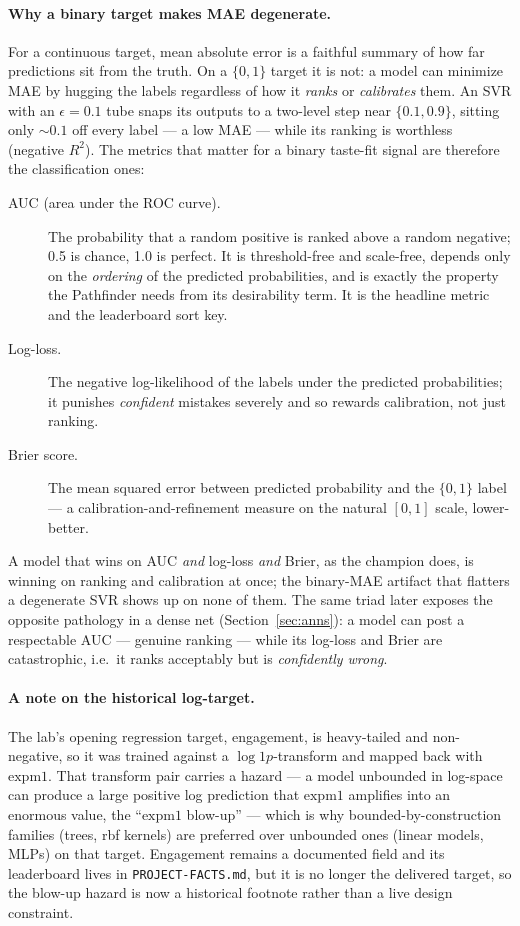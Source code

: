 \documentclass[11pt]{article}
\newcommand{\rsq}{$R^2$}
\begin{document}
\paragraph{Why a binary target makes MAE degenerate.} For a continuous target,
mean absolute error is a faithful summary of how far predictions sit from the
truth. On a $\{0,1\}$ target it is not: a model can minimize MAE by hugging the
labels regardless of how it \emph{ranks} or \emph{calibrates} them. An SVR with
an $\epsilon{=}0.1$ tube snaps its outputs to a two-level step near
$\{0.1,0.9\}$, sitting only $\sim 0.1$ off every label --- a low MAE --- while
its ranking is worthless (negative \rsq{}). The metrics that matter for a
binary taste-fit signal are therefore the classification ones:
\begin{description}
  \item[AUC (area under the ROC curve).] The probability that a random positive
  is ranked above a random negative; \num{0.5} is chance, \num{1.0} is perfect.
  It is threshold-free and scale-free, depends only on the \emph{ordering} of
  the predicted probabilities, and is exactly the property the Pathfinder needs
  from its desirability term. It is the headline metric and the leaderboard
  sort key.
  \item[Log-loss.] The negative log-likelihood of the labels under the
  predicted probabilities; it punishes \emph{confident} mistakes severely and so
  rewards calibration, not just ranking.
  \item[Brier score.] The mean squared error between predicted probability and
  the $\{0,1\}$ label --- a calibration-and-refinement measure on the natural
  $[0,1]$ scale, lower-better.
\end{description}
A model that wins on AUC \emph{and} log-loss \emph{and} Brier, as the champion
does, is winning on ranking and calibration at once; the binary-MAE artifact
that flatters a degenerate SVR shows up on none of them. The same triad later
exposes the opposite pathology in a dense net (Section~\ref{sec:anns}): a model
can post a respectable AUC --- genuine ranking --- while its log-loss and Brier
are catastrophic, i.e.\ it ranks acceptably but is \emph{confidently wrong}.

\paragraph{A note on the historical log-target.} The lab's opening regression
target, engagement, is heavy-tailed and non-negative, so it was trained against
a $\log1p$-transform and mapped back with $\text{expm1}$. That transform pair
carries a hazard --- a model unbounded in log-space can produce a large
positive log prediction that $\text{expm1}$ amplifies into an enormous value,
the ``$\text{expm1}$ blow-up'' --- which is why bounded-by-construction families
(trees, rbf kernels) are preferred over unbounded ones (linear models, MLPs) on
that target. Engagement remains a documented field and its leaderboard lives in
\texttt{PROJECT-FACTS.md}, but it is no longer the delivered target, so the
blow-up hazard is now a historical footnote rather than a live design
constraint.
\end{document}
